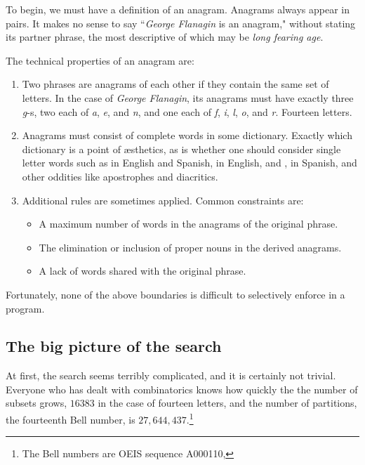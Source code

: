 \documentclass[letterpaper, 11pt]{article}
\begin{document}
To begin, we must have a definition of an anagram. Anagrams
always appear in pairs.  It makes no sense to say ``\emph{George
Flanagin} is an anagram," without stating its partner phrase, the
most descriptive of which may be \emph{long fearing age}. 

The technical properties of an anagram are:

\begin{enumerate}
\item Two phrases are anagrams of each other if they contain the
same set of letters. In the case of \emph{George Flanagin}, its
anagrams must have exactly three \emph{g}-s, two each of \emph{a},
\emph{e}, and \emph{n}, and one each of \emph{f}, \emph{i}, \emph{l},
\emph{o}, and \emph{r}.  Fourteen letters.

\item Anagrams must consist of complete words in some dictionary.
Exactly which dictionary is a point of {\ae}sthetics, as is whether
one should consider single letter words such as  in English
and Spanish,  in English, and ,  in Spanish,
and other oddities like apostrophes and diacritics.

\item Additional rules are sometimes applied. Common constraints are:

\begin{itemize}
\item A maximum number of words in the anagrams of the original phrase.

\item The elimination or inclusion of proper nouns in the derived
anagrams.

\item A lack of words shared with the original phrase.
\end{itemize}
\end{enumerate}

Fortunately, none of the above boundaries is difficult to selectively
enforce in a program. 

\subsection{The big picture of the search}
\label{sec:bigpicture}

At first, the search seems terribly complicated, and it is certainly
not trivial. Everyone who has dealt with combinatorics knows how
quickly the the number of subsets grows, $16383$ in the case of
fourteen letters, and the number of partitions, the fourteenth Bell
number, is $27,644,437$.\footnote{The Bell numbers are OEIS sequence
A000110, }
\end{document}
